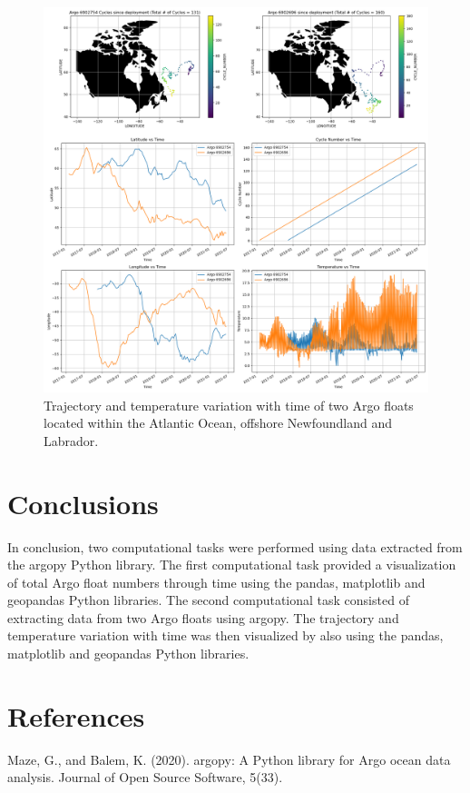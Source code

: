 \documentclass{article}
\begin{document}
\begin{figure}[H]
\includegraphics[width=\textwidth,height=\textheight,keepaspectratio]{argo_trajectory.png}
\caption{Trajectory and temperature variation with time of two Argo floats located within the Atlantic Ocean, offshore Newfoundland and Labrador.}
\end{figure}
 
 

\section{Conclusions}

In conclusion, two computational tasks were performed using data extracted from the argopy Python library. The first computational task provided a visualization of total Argo float numbers through time using the pandas, matplotlib and geopandas Python libraries. The second computational task consisted of extracting data from two Argo floats using argopy. The trajectory and temperature variation with time was then visualized by also using the pandas, matplotlib and geopandas Python libraries.

\section{References}

Maze, G., and Balem, K. (2020). argopy: A Python library for Argo ocean data analysis. Journal of Open Source Software, 5(33).
\end{document}
